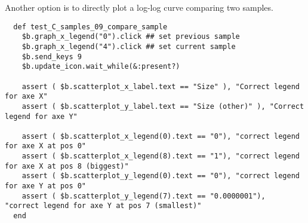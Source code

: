 Another option is to directly plot a log-log curve comparing two samples.

\begin{verbatim}
  def test_C_samples_09_compare_sample
    $b.graph_x_legend("0").click ## set previous sample
    $b.graph_x_legend("4").click ## set current sample
    $b.send_keys 9
    $b.update_icon.wait_while(&:present?)

    assert ( $b.scatterplot_x_label.text == "Size" ), "Correct legend for axe X"
    assert ( $b.scatterplot_y_label.text == "Size (other)" ), "Correct legend for axe Y"

    assert ( $b.scatterplot_x_legend(0).text == "0"), "correct legend for axe X at pos 0"
    assert ( $b.scatterplot_x_legend(8).text == "1"), "correct legend for axe X at pos 8 (biggest)"
    assert ( $b.scatterplot_y_legend(0).text == "0"), "correct legend for axe Y at pos 0"
    assert ( $b.scatterplot_y_legend(7).text == "0.0000001"),   "correct legend for axe Y at pos 7 (smallest)"
  end
\end{verbatim}

